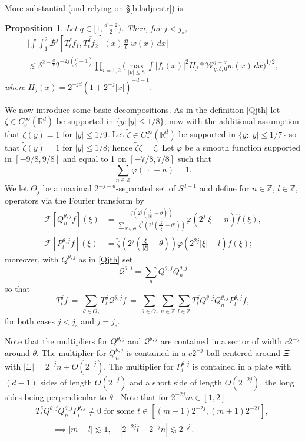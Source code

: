 \documentclass[11pt]{amsart}
\newtheorem{proposition}[theorem]{Proposition}
\theoremstyle{definition}
\numberwithin{theorem}{section}
\numberwithin{definition}{section}
\newcommand{\Be}{\begin{equation}}
\newcommand{\Ee}{\end{equation}}
\newcommand{\Z}{\mathbb{Z}}
\newcommand{\note}[1]{\footnote{\texttt{\Small #1}}}
\def\lc{\lesssim}
\def\eps{\varepsilon}
\def\vphi{\varphi}
\def\bbR{{\mathbb {R}}}
\def\bbZ{{\mathbb {Z}}}
\def\cB{{\mathcal {B}}}
\def\cF{{\mathcal {F}}}
\def\cQ{{\mathcal {Q}}}
\def\cW{{\mathcal {W}}}
\begin{document}
\noindent More substantial (and relying on \S\ref{biladjrestr}) is

\begin{proposition} \label{Bj} Let $q\in[1,\frac{d+2}{2})$.
Then, for $j<j_\circ$,
\begin{multline*}
\Big|\int \!\int_{1}^{2}
\cB^j [T^\delta_t f_1,\overline{T^{\delta}_t f_2}](x) \frac{dt}{t}\,w(x)\,dx\Big|
\\ \lc \delta^{2-\frac dq} 2^{-2j (\frac{d}{q}-1)}
\prod_{i=1,2}\Big(\max_{|\nu|\le 8}\int |f_i(x)|^2 H_j*\cW^{j-\nu}_{q,\delta,0}w(x)\,dx\Big)^{1/2},
\end{multline*}
where $H_j(x)=2^{-jd}(1+2^{-j}|x|)^{-d-1}$.
\end{proposition}

We now introduce some basic decompositions.
As in the definition \eqref{Qjth} let $\zeta\in C^\infty_c(\bbR^d)$
be supported in $\{y:|y|\le 1/8\}$, now with the additional assumption that
$\zeta (y)=1$ for $|y|\le 1/9$.
Let $\widetilde \zeta\in C^\infty_c(\bbR^d)$
be supported in $\{y:|y|\le 1/7\}$ so that
$\widetilde \zeta (y)=1$ for $|y|\le 1/8$; hence
$\widetilde \zeta\zeta=\zeta$.
 Let $\varphi$
be a smooth function supported in $[-9/8,9/8]$ and equal to 1 on
$[-7/8,7/8]$ such that $$\sum_{n\in\Z}\varphi(\,\cdot\,-n)=1.$$
We let $\Theta_j$ be a maximal $2^{-j-d}$-separated set of $S^{d-1}$ and
define  for $n\in \bbZ$, $l\in \bbZ$,  operators via the Fourier transform by
\begin{align*}
\cF[Q^{\theta,j}_n  f](\xi) &=  \frac{\zeta(2^j(\tfrac{\xi}{|\xi|}-\theta))}
{\sum_{\theta'\in \Theta_j}\zeta^2(2^j(\tfrac{\xi}{|\xi|}-\theta'))}
\vphi(2^j|\xi|-n) \widehat f(\xi),
\\
\cF[P^{\theta,j}_l  f](\xi) &=  \widetilde \zeta(2^j(\tfrac{\xi}{|\xi|}-\theta))
\vphi(2^{2j}|\xi|-l) \widehat f(\xi);
\end{align*}
moreover, with $Q^{\theta,j}$ as in  \eqref{Qjth} set
$$ \cQ^{\theta,j}= \sum_n Q^{\theta,j}Q^{\theta,j}_n$$
so that
$$
T^\delta_t f \,= \,
\sum_{\theta\in  \Theta_j}T^\delta_t \cQ^{\theta,j}f\,=\,
\sum_{\theta\in \Theta_j}
\sum_{n\in \bbZ} \sum_{l\in \bbZ}
T^\delta_t Q^{\theta,j}
Q^{\theta,j}_n
P^{\theta,j}_lf,
$$
for both cases $j<j_\circ$ and $j=j_\circ$.

Note that the multipliers for $Q^{\theta,j}$ and $\cQ^{\theta,j}$ are
 contained in a sector of width $c2^{-j}$ around $\theta$. The multiplier for
$Q^{\theta,j}_n $ is contained in a $c2^{-j}$ ball centered around $\Xi$ with
$|\Xi|=2^{-j}n +O(2^{-j})$.
The multiplier for
$P^{\theta,j}_l$ is contained in a plate with $(d-1)$ sides
of length $O(2^{-j})$ and a short side of length $O(2^{-2j})$, the long sides
being perpendicular to $\theta$ .
Note that for $2^{-2j}m\in [1,2]$
\Be
\label{tnmloc}
\begin{aligned}
&T^\delta_t Q^{\theta,j}  Q^{\theta,j}_n
P^{\theta,j}_l\neq 0  \text{ for some } t\in [(m-1)2^{-2j}, (m+1)2^{-2j}],\quad
\\ &\qquad \implies
|m-l|\lc 1, \quad
|2^{-2j}l-2^{-j} n|\lc 2^{-j}
\,.
\end{aligned}
\Ee
\end{document}
